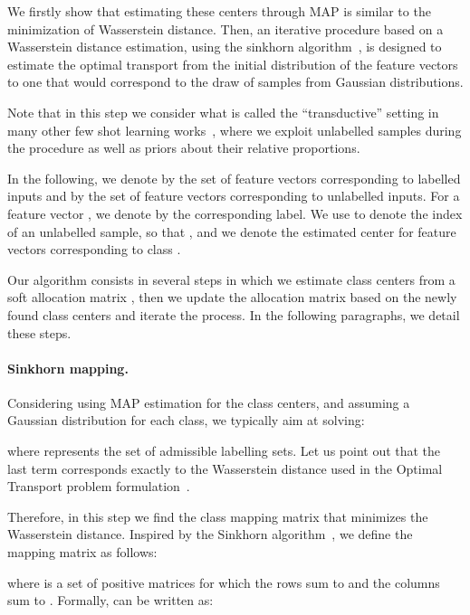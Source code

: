 \documentclass[twoside]{article}
\begin{document}
We firstly show that estimating these centers through MAP is similar to the minimization of Wasserstein distance. Then, an iterative procedure based on a Wasserstein distance estimation, using the sinkhorn algorithm~\cite{cuturi2013sinkhorn,vallender1974calculation,huang2019few}, is designed to estimate the optimal transport from the initial distribution of the feature vectors to one that would correspond to the draw of samples from Gaussian distributions. 

Note that in this step we consider what is called the ``transductive'' setting in many other few shot learning works~\cite{liu2018learning, lichtenstein2020tafssl, liu2019prototype, hu2020exploiting, kye2020transductive, garcia2017few, kim2019edge, gidaris2019generating, ye2018learning}, where we exploit unlabelled samples during the procedure as well as priors about their relative proportions. 

In the following, we denote by  the set of feature vectors corresponding to labelled inputs and by  the set of feature vectors corresponding to unlabelled inputs. For a feature vector , we denote by  the corresponding label. We use  to denote the index of an unlabelled sample, so that , and we denote  the estimated center for feature vectors corresponding to class .

Our algorithm consists in several steps in which we estimate class centers from a soft allocation matrix , then we update the allocation matrix based on the newly found class centers and iterate the process. In the following paragraphs, we detail these steps.

\paragraph{Sinkhorn mapping.} Considering using MAP estimation for the class centers, and assuming a Gaussian distribution for each class, we typically aim at solving:

where  represents the set of admissible labelling sets. Let us point out that the last term corresponds exactly to the Wasserstein distance used in the Optimal Transport problem formulation~\cite{cuturi2013sinkhorn}.

Therefore, in this step we find the class mapping matrix that minimizes the Wasserstein distance. Inspired by the Sinkhorn algorithm~\cite{villani2008optimal,cuturi2013sinkhorn}, we define the mapping matrix  as follows:

where  is a set of positive matrices for which the rows sum to  and the columns sum to . Formally,  can be written as:
\end{document}
